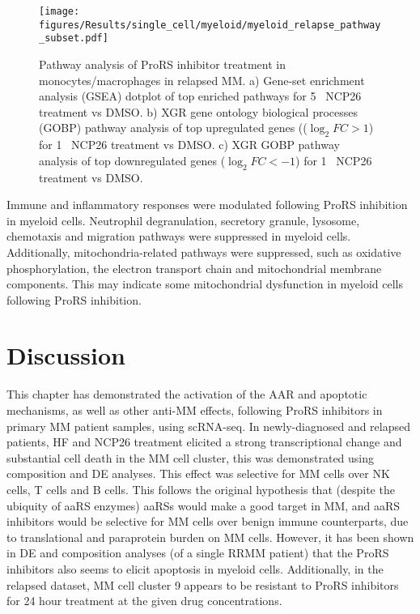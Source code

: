 \begin{figure}[htb]
\centering
\texttt{[image: figures/Results/single\_cell/myeloid/myeloid\_relapse\_pathway\_subset.pdf]}
\caption[Myeloid cell pathway analysis- relapsed MM]{Pathway analysis of ProRS inhibitor treatment in monocytes/macrophages in relapsed MM.
a) Gene-set enrichment analysis (GSEA) dotplot of top enriched pathways for 5\si{\micro\Molar} NCP26 treatment vs DMSO.
b) XGR gene ontology biological processes (GOBP) pathway analysis of top upregulated genes (($\log_{2}FC >1$) for 1\si{\micro\Molar} NCP26 treatment vs DMSO.
c) XGR GOBP pathway analysis of top downregulated genes ($\log_{2}FC < -1$) for 1\si{\micro\Molar} NCP26 treatment vs DMSO.
}
\label{fig:myeloid_pathway_relapsed}
\end{figure}
Immune and inflammatory responses were modulated following ProRS inhibition in myeloid cells.
Neutrophil degranulation, secretory granule, lysosome, chemotaxis and migration pathways were suppressed in myeloid cells.
Additionally, mitochondria-related pathways were suppressed, such as oxidative phosphorylation, the electron transport chain and mitochondrial membrane components.
This may indicate some mitochondrial dysfunction in myeloid cells following ProRS inhibition.


\section{Discussion}
This chapter has demonstrated the activation of the AAR and apoptotic mechanisms, as well as other anti-MM effects, following ProRS inhibitors in primary MM patient samples, using scRNA-seq.
In newly-diagnosed and relapsed patients, HF and NCP26 treatment elicited a strong transcriptional change and substantial cell death in the MM cell cluster, this was demonstrated using composition and DE analyses.
This effect was selective for MM cells over NK cells, T cells and B cells.
This follows the original hypothesis that (despite the ubiquity of aaRS enzymes) aaRSs would make a good target in MM, and aaRS inhibitors would be selective for MM cells over benign immune counterparts, due to translational and paraprotein burden on MM cells.
However, it has been shown in DE and composition analyses (of a single RRMM patient) that the ProRS inhibitors also seems to elicit apoptosis in myeloid cells.
Additionally, in the relapsed dataset, MM cell cluster 9 appears to be resistant to ProRS inhibitors for 24 hour treatment at the given drug concentrations.

